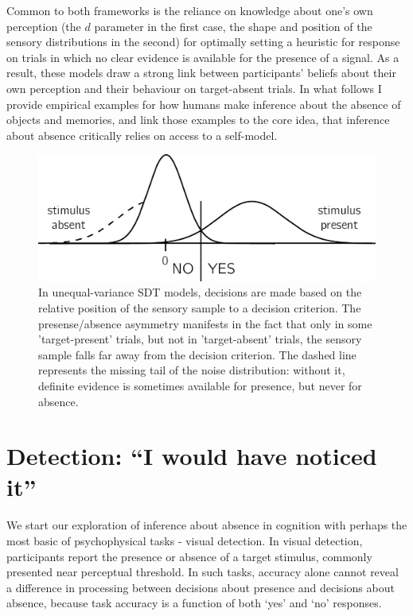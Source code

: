 \documentclass[12pt,twoside]{reedthesis}
\begin{document}
Common to both frameworks is the reliance on knowledge about one's own perception (the \(d\) parameter in the first case, the shape and position of the sensory distributions in the second) for optimally setting a heuristic for response on trials in which no clear evidence is available for the presence of a signal. As a result, these models draw a strong link between participants' beliefs about their own perception and their behaviour on target-absent trials. In what follows I provide empirical examples for how humans make inference about the absence of objects and memories, and link those examples to the core idea, that inference about absence critically relies on access to a self-model.
\begin{figure}
\includegraphics[width=0.7\linewidth]{figure/intro/sdt} \caption[The unequal variance Signal Detection model]{In unequal-variance SDT models, decisions are made based on the relative position of the sensory sample to a decision  criterion. The presense/absence asymmetry manifests in the fact that only in some 'target-present' trials, but not in 'target-absent' trials, the sensory sample falls far away from the decision criterion. The dashed line represents the missing tail of the noise distribution: without it, definite evidence is sometimes available for presence, but never for absence.}\label{fig:intro-sdt}
\end{figure}
\hypertarget{detection-i-would-have-noticed-it}{%
\section{Detection: ``I would have noticed it''}\label{detection-i-would-have-noticed-it}}

We start our exploration of inference about absence in cognition with perhaps the most basic of psychophysical tasks - visual detection. In visual detection, participants report the presence or absence of a target stimulus, commonly presented near perceptual threshold. In such tasks, accuracy alone cannot reveal a difference in processing between decisions about presence and decisions about absence, because task accuracy is a function of both `yes' and `no' responses.
\end{document}

